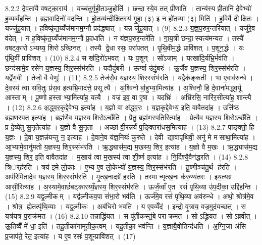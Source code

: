 8.2.2
दे॒वता॑यै वषट्का॒राय॑ । यच्च॑तुर्गृही॒तञ्जु॒होति॑ । छन्दा॑स्ये॒व तत् प्री॑णाति । तान्य॑स्य प्री॒तानि॑ दे॒वेभ्यो॑ ह॒व्यव्वँ॑हन्ति । ब्र॒ह्म॒वा॒दिनो॑ वदन्ति । हो॒त॒व्य॑न्दीक्षि॒तस्य॑ गृ॒हा (३) इ न हो॑त॒व्या (३) मिति॑ । ह॒विर्वै दीक्षि॒तः । यज्जु॑हु॒यात् । ह॒विष्कृ॑त॒य्यँज॑मानम॒ग्नौ प्रद॑द्ध्यात् । यन्न जु॑हु॒यात् । (9)
8.2.3
य॒ज्ञ॒प॒रुर॒न्तरि॑यात् । यजु॑रे॒व व॑देत् । न ह॒विष्कृ॑त॒य्यँज॑मानम॒ग्नौ प्र॒दधा॑ति । न य॑ज्ञप॒रुर॒न्तरे॑ति । गा॒य॒त्री छन्दा॒॒स्यत्य॑मन्यत । तस्यै॑ वषट्का॒रोऽभ्यय्य॒ शिरोऽच्छिनत् । तस्यै द्वे॒धा रसः॒ परा॑पतत् । पृ॒थि॒वीम॒र्द्धः प्रावि॑शत् । प॒शून॒र्द्धः । यः पृ॑थि॒वीं प्रावि॑शत् । (10)
8.2.4
स ख॑दि॒रो॑ऽभवत् । यः प॒शून् । सो॑ऽजाम् । यत्खा॑दि॒र्यभ्रि॒र्भव॑ति । छन्द॑सामे॒व रसे॑न य॒ज्ञस्य॒ शिर॒स्संभ॑रति । यदौदुं॑बरी । ऊर्ग्वा उ॑दुं॒बरः॑ । ऊ॒र्जैव य॒ज्ञस्य॒ शिर॒स्संभ॑रति । यद्वै॑ण॒वी । तेजो॒ वै वेणुः॑ । (11)
8.2.5
तेज॑सै॒व य॒ज्ञस्य॒ शिर॒स्संभ॑रति । यद्वैक॑ङ्कती । भा ए॒वाव॑रुन्धे । दे॒वस्य॑ त्वा सवि॒तुः प्र॑स॒व इत्यभ्रि॒माद॑त्ते॒ प्रसूत्यै । अ॒श्विनोर्बा॒हुभ्या॒मित्या॑ह । अ॒श्विनौ॒ हि दे॒वाना॑मद्ध्व॒र्यू आस्ताम् । पू॒ष्णो हस्ताभ्या॒मित्या॑ह॒ यत्यै । वज्र॑ इव॒ वा ए॒षा । यदभ्रिः॑ । अभ्रि॑रसि॒ नारि॑र॒सीत्या॑ह॒ शान्त्यै । (12)
8.2.6
अ॒द्ध्व॒र॒कृद्दे॒वेभ्य॒ इत्या॑ह । य॒ज्ञो वा अ॑द्ध्व॒रः । य॒ज्ञ॒कृद्दे॒वेभ्य॒ इति॒ वावैतदा॑ह । उत्ति॑ष्ठ ब्रह्मणस्पत॒ इत्या॑ह । ब्रह्म॑णै॒व य॒ज्ञस्य॒ शिरोऽच्छै॑ति । प्रैतु॒ ब्रह्म॑ण॒स्पति॒रित्या॑ह । प्रेत्यै॒व य॒ज्ञस्य॒ शिरोऽच्छै॑ति । प्र दे॒व्ये॑तु सू॒नृतेत्या॑ह । य॒ज्ञो वै सू॒नृता । अच्छा॑ वी॒रन्नर्यं॑ प॒ङ्क्तिरा॑धस॒मित्या॑ह । (13)
8.2.7
पाङ्क्तो॒ हि य॒ज्ञः । दे॒वा य॒ज्ञन्न॑यन्तु न॒ इत्या॑ह । दे॒वाने॒व य॑ज्ञ॒नियः॑ कुरुते । देवी द्यावापृथिवी॒ अनु॑ मे मसाथा॒मित्या॑ह । आ॒भ्यामे॒वानु॑मतो य॒ज्ञस्य॒ शिर॒स्संभ॑रति । ऋ॒द्ध्यास॑म॒द्य म॒खस्य॒ शिर॒ इत्या॑ह । य॒ज्ञो वै म॒खः । ऋ॒द्ध्यास॑म॒द्य य॒ज्ञस्य॒ शिर॒ इति वावैतदा॑ह । म॒खाय॑ त्वा म॒खस्य॑ त्वा शी॒र्ष्ण इत्या॑ह । नि॒र्दिश्यै॒वैन॑द्धरति । (14)
8.2.8
त्रिर््ह॑रति । त्रय॑ इ॒मे लो॒काः । ए॒भ्य ए॒व लो॒केभ्यो॑ य॒ज्ञस्य॒ शिर॒स्संभ॑रति । तू॒ष्णीञ्च॑तु॒र्थ ह॑रति । अप॑रिमितादे॒व य॒ज्ञस्य॒ शिर॒स्संभ॑रति । मृ॒त्ख॒नादग्रे॑ हरति । तस्मान्मृत्ख॒नः क॑रु॒ण्य॑तरः । इय॒त्यग्र॑ आसी॒रित्या॑ह । अ॒स्यामे॒वाछं॑बट्कारय्यँ॒ज्ञस्य॒ शिर॒स्संभ॑रति । ऊर्जं॒व्वाँ ए॒त रसं॑ पृथि॒व्या उ॑प॒दीका॒ उद्दि॑हन्ति । (15)
8.2.9
यद्व॒ल्मीकम् । यद्व॑ल्मीकव॒पा सं॑भा॒रो भव॑ति । ऊर्ज॑मे॒व रसं॑ पृथि॒व्या अव॑रुन्धे । अथो॒ श्रोत्र॑मे॒व । श्रोत्र॒॒ ह्ये॑तत्पृ॑थि॒व्याः । यद्व॒ल्मीकः॑ । अब॑धिरो भवति । य ए॒वव्वेँद॑ । इन्द्रो॑ वृ॒त्राय॒ वज्र॒मुद॑यच्छत् । स यत्र॑यत्र प॒राक्र॑मत । (16)
8.2.10
तन्नाद्ध्रि॑यत । स पू॑तीकस्तं॒बे पराक्रमत । सोऽद्ध्रियत । सोऽब्रवीत् । ऊ॒तिव्वैँ मे॑ धा॒ इति॑ । तदू॒तीका॑नामूतीक॒त्वम् । यदू॒तीका॒ भव॑न्ति । य॒ज्ञायै॒वोतिन्द॑धति । अ॒ग्नि॒जा अ॑सि प्र॒जाप॑ते॒ रेत॒ इत्या॑ह । य ए॒व रसः॑ प॒शून्प्रावि॑शत् । (17)
